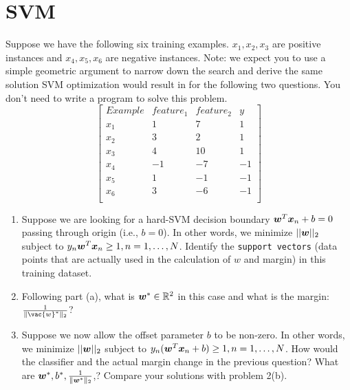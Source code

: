 \documentclass[11pt]{article}
\begin{document}
\section{SVM }

Suppose we have the following six training examples. $x_1, x_2, x_3$ are positive instances and  $x_4, x_5, x_6$ are negative instances. Note: we expect you to use a simple geometric argument to narrow down the search and derive the same solution SVM optimization would result in for the following two questions. You don't need to write a program to solve this problem.
$$\begin{bmatrix}
	Example & feature_1  & feature_2 & y \\
	\hline
	x_1 & 1  & 7  & 1  \\
	x_2 & 3  & 2  & 1  \\
	x_3 & 4  & 10 & 1  \\
	x_4 & -1 & -7 & -1 \\
	x_5 & 1  & -1 & -1 \\
	x_6 & 3  & -6 & -1 \\
\end{bmatrix}$$

\begin{enumerate}
\item {} 
Suppose we are looking for a hard-SVM decision boundary $\boldsymbol{w}^T \boldsymbol{x}_n +b =0$ passing through origin (i.e., $b=0$). In other words, we minimize $||\boldsymbol{w}||_2$ subject to $y_n \boldsymbol{w}^T \boldsymbol{x}_n \geq 1, n = 1, \ldots, N$. Identify the \verb|support vectors| (data points that are actually used in the calculation of $w$ and margin) in this training dataset. \newline
\solution{}

\item {}
Following part (a), what is $\boldsymbol{w}^\ast \in \mathbb{R}^2$ in this case and what is the margin: $\frac{1}{\|\vac{w}^\ast\|_2}$? \newline
\solution{}

\item {} Suppose we now allow the offset parameter $b$ to be non-zero. In other words,  we minimize $||\boldsymbol{w}||_2$ subject to $y_n (\boldsymbol{w}^T \boldsymbol{x}_n + b) \geq 1, n = 1, \ldots, N$. How would the classifier and the actual margin change in the previous question? What are $\boldsymbol{w}^\ast, b^\ast, \frac{1}{\|\boldsymbol{w}^\ast\|_2}$,? Compare your solutions with problem 2(b).\newline
\solution{}

\end{enumerate}
\end{document}
